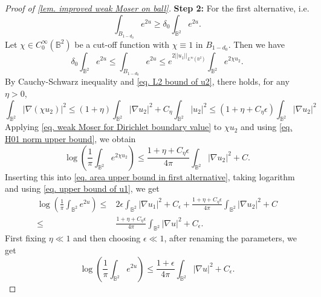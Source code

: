 \documentclass[11pt,a4paper,twoside]{amsart}
\newtheorem{sketch proof}{Sketch of the proof}[section]
\begin{document}
\begin{proof}[Proof of \cref{lem. improved weak Moser on ball}]
        {\bf Step 2:} For the first alternative, i.e.
        \[
        \int_{B_{1-d_0}}e^{2u}
        \geq \delta_0\int_{\mathbb{B}^2}e^{2u}.
        \]
        Let $\chi\in C_0^{\infty}(\mathbb{B}^2)$ be a cut-off function with $\chi\equiv 1$ in $B_{1-d_0}$. Then we have
        \begin{equation}\label{eq. area upper bound in first alternative}
            \delta_0 \int_{\mathbb{B}^2}e^{2u}
        \leq \int_{B_{1-d_0}}e^{2u}
        \leq e^{2||u_1||
        _{L^\infty(\mathbb{B}^2)}}
        \int_{\mathbb{B}^2}e^{2\chi u_2}.
        \end{equation}
        By Cauchy-Schwarz inequality and \cref{eq. L2 bound of u2}, there holds, for any $\eta>0$,
        \begin{equation}
        \label{eq. H01 norm upper bound}
            \int_{\mathbb{B}^2}|\nabla(\chi u_2)|^2
        \leq (1+\eta)
        \int_{\mathbb{B}^2}|\nabla u_2|^2
        +C_\eta\int_{\mathbb{B}^2}|u_2|^2
        \leq (1+\eta+C_\eta\epsilon)
        \int_{\mathbb{B}^2}|\nabla u_2|^2
        \end{equation}
        Applying \cref{eq. weak Moser for Dirichlet boundary value} to $\chi u_2$ and using \cref{eq. H01 norm upper bound}, we obtain
        \[
        \log\left(
        \frac{1}{\pi}
        \int_{\mathbb{B}^2}e^{2\chi u_2}
        \right)
        \leq \frac{1+\eta+C_\eta\epsilon}{4\pi}
        \int_{\mathbb{B}^2}|\nabla u_2|^2
        +C.
        \]
        Inserting this into \cref{eq. area upper bound in first alternative}, taking logarithm and using \cref{eq. upper bound of u1}, we get 
        \begin{align*}
            \log\left(
        \frac{1}{\pi}
        \int_{\mathbb{B}^2}e^{2u}
        \right)
        \leq& 2\epsilon\int_{\mathbb{B}^2}
        |\nabla u_1|^2
        +C_\epsilon
        +\frac{1+\eta+C_\eta\epsilon}{4\pi}
        \int_{\mathbb{B}^2}|\nabla u_2|^2
        +C\\
        \leq &\frac{1+\eta+C_\eta\epsilon}{4\pi}
        \int_{\mathbb{B}^2}|\nabla u|^2
        +C_\epsilon.
        \end{align*}
        First fixing $\eta\ll 1$ and then choosing $\epsilon\ll 1$, after renaming the parameters, we get
        \[
        \log\left(
        \frac{1}{\pi}
        \int_{\mathbb{B}^2}e^{2u}
        \right)
        \leq \frac{1+\epsilon}{4\pi}
        \int_{\mathbb{B}^2}|\nabla u|^2
        +C_\epsilon.
        \]    


\end{proof}
\end{document}
